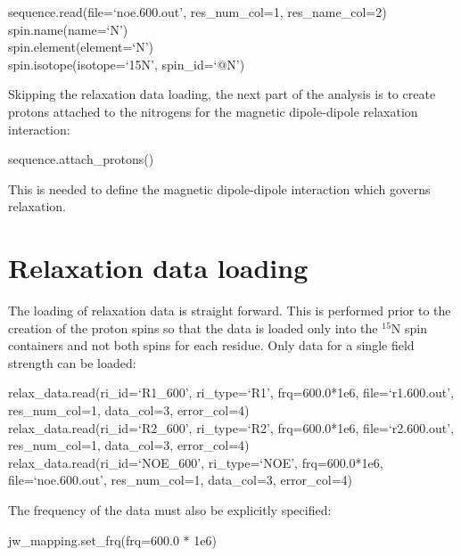 \begin{exampleenv}
sequence.read(file=`noe.600.out', res\_num\_col=1, res\_name\_col=2) \\
spin.name(name=`N') \\
spin.element(element=`N') \\
spin.isotope(isotope=`15N', spin\_id=`@N')
\end{exampleenv}

Skipping the relaxation data loading, the next part of the analysis is to create protons attached to the nitrogens for the magnetic dipole-dipole relaxation interaction:

\begin{exampleenv}
sequence.attach\_protons()
\end{exampleenv}

This is needed to define the magnetic dipole-dipole interaction which governs relaxation.




\section{Relaxation data loading}

The loading of relaxation data is straight forward.  This is performed prior to the creation of the proton spins so that the data is loaded only into the $^{15}$N spin containers and not both spins for each residue.  Only data for a single field strength can be loaded:

\begin{exampleenv}
relax\_data.read(ri\_id=`R1\_600',  ri\_type=`R1',  frq=600.0*1e6, file=`r1.600.out', res\_num\_col=1, data\_col=3, error\_col=4) \\
relax\_data.read(ri\_id=`R2\_600',  ri\_type=`R2',  frq=600.0*1e6, file=`r2.600.out', res\_num\_col=1, data\_col=3, error\_col=4) \\
relax\_data.read(ri\_id=`NOE\_600', ri\_type=`NOE', frq=600.0*1e6, file=`noe.600.out', res\_num\_col=1, data\_col=3, error\_col=4)
\end{exampleenv}

The frequency of the data must also be explicitly specified:

\begin{exampleenv}
jw\_mapping.set\_frq(frq=600.0 * 1e6) \\
\end{exampleenv}



